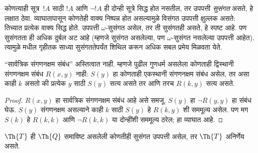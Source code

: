 \documentclass[../../../include/open-logic-section]{subfiles}
\begin{document}


\begin{explain}
कोणत्याही सूत्र~$!A$ साठी $!A$ आणि $\lnot !A$ ही दोन्ही सूत्रे
सिद्ध होत नसतील, तर उपपत्ती \emph{सुसंगत} असते, हे लक्षात ठेवा.
व्याघातापासून कोणतेही वाक्य निष्पन्न होत असल्यामुळे विसंगत उपपत्ती
क्षुल्लक असते: तिच्यात प्रत्येक वाक्य सिद्ध होते.
उपपत्ती $\omega$-सुसंगत असेल, तर ती सुसंगतही असते, हे स्पष्ट आहे.
पण सुसंगतता ही अधिक दुर्बल अट आहे (म्हणजे सुसंगत असलेल्या, पण
$\omega$-सुसंगत नसलेल्या उपपत्ती आहेत). त्यामुळे
 मधील गृहीतक साध्या सुसंगततेपर्यंत
शिथिल करून अधिक सबल प्रमेय मिळवता येते.
\end{explain}

\begin{lem}
``सार्वत्रिक संगणनक्षम संबंध'' अस्तित्वात नाही. म्हणजे पुढील गुणधर्म
असलेला कोणताही द्विस्थानी संगणनक्षम संबंध $R(x,y)$ नाही:
$S(y)$ हा कोणताही एकस्थानी संगणनक्षम संबंध असेल, तर असा काही $k$
असतो की प्रत्येक $y$ साठी $S(y)$ सत्य असते तर आणि तरच
$R(k,y)$ सत्य असते.
\end{lem}

\begin{proof}
$R(x,y)$ हा सार्वत्रिक संगणनक्षम संबंध आहे असे समजू.
$S(y)$ हा $\lnot R(y,y)$ हा संबंध घेऊ. $S(y)$ संगणनक्षम असल्याने
काही $k$ साठी $S(y)$ हे $R(k,y)$ शी सममूल्य असेल.
पण मग $S(k)$ हे $R(k,k)$ आणि $\lnot R(k,k)$ या
दोन्हींशी सममूल्य ठरेल; हा व्याघात आहे.
\end{proof}


\begin{thm}
$\Th{T}$ ही $\Th{Q}$ समाविष्ट असलेली कोणतीही सुसंगत उपपत्ती
असेल, तर $\Th{T}$ अनिर्णेय असते.
\end{thm}
\end{document}
